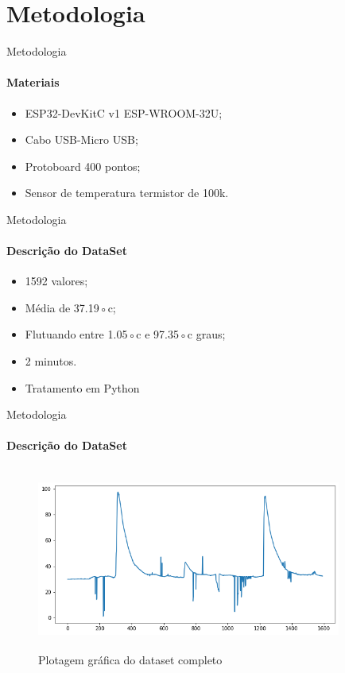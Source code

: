\documentclass[]{beamer}
\begin{document}

\section{Metodologia}

	\begin{frame}{Metodologia}
		\framesubtitle{Materiais}
		\begin{itemize}
			\item ESP32-DevKitC v1 ESP-WROOM-32U;
			\item Cabo USB-Micro USB;
			\item Protoboard 400 pontos;
			\item Sensor de temperatura termistor de 100k.
		\end{itemize}
	\end{frame}

	\begin{frame}{Metodologia}
		\framesubtitle{Descrição do DataSet}
		\begin{itemize}
			\item 1592 valores;
			\item Média de 37.19◦c;
			\item Flutuando entre 1.05◦c e 97.35◦c graus;
			\item 2 minutos.
			\item Tratamento em Python
		\end{itemize}
	\end{frame}

	\begin{frame}{Metodologia}
		\framesubtitle{Descrição do DataSet}
		\begin{figure}[!htb]	
			\begin{center}
				\includegraphics[width=10cm,height=6cm]{../imagens/sensores/bruto.png}
			\end{center}
			\caption{Plotagem gráfica do dataset completo}
			\label{figura:bruto}
		\end{figure}	
	\end{frame}
\end{document}
